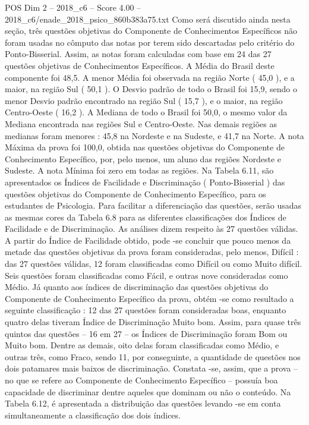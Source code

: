 \begin{textsample}{POS Dim 2 – 2018\_c6 – Score 4.00 – 2018\_c6/enade\_2018\_psico\_860b383a75.txt}
Como será discutido ainda nesta seção, três questões objetivas do Componente de Conhecimentos Específicos não foram usadas no cômputo das notas por terem sido descartadas pelo critério do Ponto-Bisserial.
Assim, as notas foram calculadas com base em 24 das 27 questões objetivas de Conhecimentos Específicos.
A Média do Brasil deste componente foi 48,5.
A menor Média foi observada na região Norte ( 45,0 ), e a maior, na região Sul ( 50,1 ).
O Desvio padrão de todo o Brasil foi 15,9, sendo o menor Desvio padrão encontrado na região Sul ( 15,7 ), e o maior, na região Centro-Oeste ( 16,2 ).
A Mediana de todo o Brasil foi 50,0, o mesmo valor da Mediana encontrada nas regiões Sul e Centro-Oeste.
Nas demais regiões as medianas foram menores : 45,8 na Nordeste e na Sudeste, e 41,7 na Norte.
A nota Máxima da prova foi 100,0, obtida nas questões objetivas do Componente de Conhecimento Específico, por, pelo menos, um aluno das regiões Nordeste e Sudeste.
A nota Mínima foi zero em todas as regiões.
Na Tabela 6.11, são apresentados os Índices de Facilidade e Discriminação ( Ponto-Bisserial ) das questões objetivas do Componente de Conhecimento Específico, para os estudantes de Psicologia.
Para facilitar a diferenciação das questões, serão usadas as mesmas cores da Tabela 6.8 para as diferentes classificações dos Índices de Facilidade e de Discriminação.
As análises dizem respeito às 27 questões válidas.
A partir do Índice de Facilidade obtido, pode -se concluir que pouco menos da metade das questões objetivas da prova foram consideradas, pelo menos, Difícil : das 27 questões válidas, 12 foram classificadas como Difícil ou como Muito difícil.
Seis questões foram classificadas como Fácil, e outras nove consideradas como Médio.
Já quanto aos índices de discriminação das questões objetivas do Componente de Conhecimento Específico da prova, obtém -se como resultado a seguinte classificação : 12 das 27 questões foram consideradas boas, enquanto quatro delas tiveram Índice de Discriminação Muito bom.
Assim, para quase três quintos das questões – 16 em 27 – os Índices de Discriminação foram Bom ou Muito bom.
Dentre as demais, oito delas foram classificadas como Médio, e outras três, como Fraco, sendo 11, por conseguinte, a quantidade de questões nos dois patamares mais baixos de discriminação.
Constata -se, assim, que a prova – no que se refere ao Componente de Conhecimento Específico – possuía boa capacidade de discriminar dentre aqueles que dominam ou não o conteúdo.
Na Tabela 6.12, é apresentada a distribuição das questões levando -se em conta simultaneamente a classificação dos dois índices.

\end{textsample}
